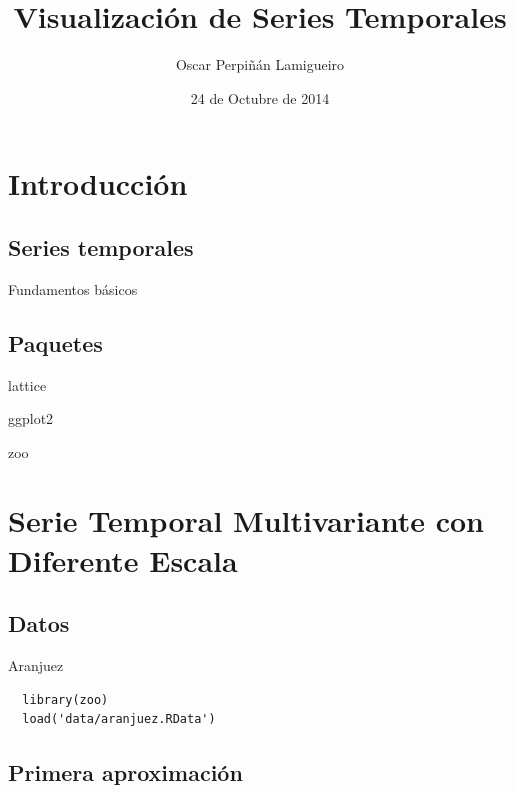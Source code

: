 \documentclass[xcolor={usenames,svgnames,dvipsnames}]{beamer}
\author{Oscar Perpiñán Lamigueiro}
\date{24 de Octubre de 2014}
\title{Visualización de Series Temporales}
\begin{document}
\maketitle

\section{Introducción}
\label{sec-1}

\subsection{Series temporales}
\label{sec-1-1}
\begin{frame}[label=sec-1-1-1]{Fundamentos básicos}
\end{frame}

\subsection{Paquetes}
\label{sec-1-2}
\begin{frame}[label=sec-1-2-1]{lattice}
\end{frame}
\begin{frame}[label=sec-1-2-2]{ggplot2}
\end{frame}
\begin{frame}[label=sec-1-2-3]{zoo}
\end{frame}

\section{Serie Temporal Multivariante con Diferente Escala}
\label{sec-2}

\subsection{Datos}
\label{sec-2-1}

\begin{frame}[fragile,label=sec-2-1-1]{Aranjuez}
 \lstset{language=R,label= ,caption= ,numbers=none}
\begin{lstlisting}
  library(zoo)
  load('data/aranjuez.RData')
\end{lstlisting}
\end{frame}

\subsection{Primera aproximación}
\label{sec-2-2}
\end{document}
